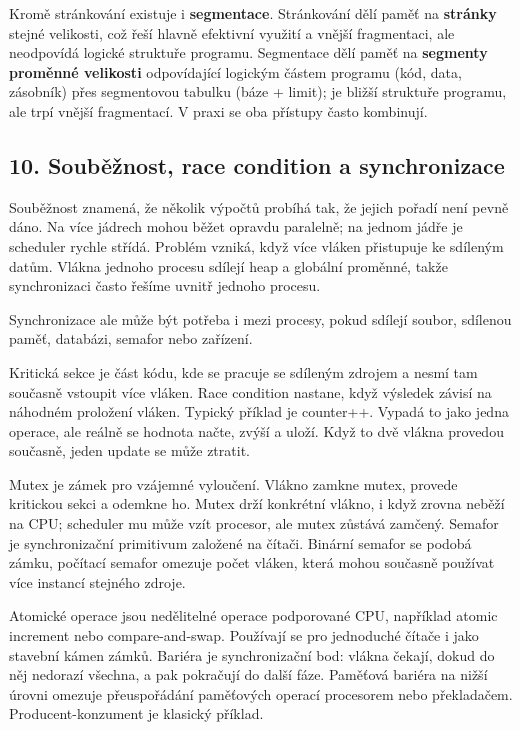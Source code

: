 \documentclass[11pt,a4paper]{article}
\begin{document}
Kromě stránkování existuje i \textbf{segmentace}. Stránkování dělí paměť na \textbf{stránky} stejné velikosti, což řeší hlavně efektivní využití a vnější fragmentaci, ale neodpovídá logické struktuře programu. Segmentace dělí paměť na \textbf{segmenty proměnné velikosti} odpovídající logickým částem programu (kód, data, zásobník) přes segmentovou tabulku (báze + limit); je bližší struktuře programu, ale trpí vnější fragmentací. V praxi se oba přístupy často kombinují.

\subsection*{10. Souběžnost, race condition a synchronizace}

Souběžnost znamená, že několik výpočtů probíhá tak, že jejich pořadí není pevně dáno. Na více jádrech mohou běžet opravdu paralelně; na jednom jádře je scheduler rychle střídá. Problém vzniká, když více vláken přistupuje ke sdíleným datům. Vlákna jednoho procesu sdílejí heap a globální proměnné, takže synchronizaci často řešíme uvnitř jednoho procesu.

Synchronizace ale může být potřeba i mezi procesy, pokud sdílejí soubor, sdílenou paměť, databázi, semafor nebo zařízení.

Kritická sekce je část kódu, kde se pracuje se sdíleným zdrojem a nesmí tam současně vstoupit více vláken. Race condition nastane, když výsledek závisí na náhodném proložení vláken. Typický příklad je counter++. Vypadá to jako jedna operace, ale reálně se hodnota načte, zvýší a uloží. Když to dvě vlákna provedou současně, jeden update se může ztratit.

Mutex je zámek pro vzájemné vyloučení. Vlákno zamkne mutex, provede kritickou sekci a odemkne ho. Mutex drží konkrétní vlákno, i když zrovna neběží na CPU; scheduler mu může vzít procesor, ale mutex zůstává zamčený. Semafor je synchronizační primitivum založené na čítači. Binární semafor se podobá zámku, počítací semafor omezuje počet vláken, která mohou současně používat více instancí stejného zdroje.

Atomické operace jsou nedělitelné operace podporované CPU, například atomic increment nebo compare-and-swap. Používají se pro jednoduché čítače i jako stavební kámen zámků. Bariéra je synchronizační bod: vlákna čekají, dokud do něj nedorazí všechna, a pak pokračují do další fáze. Paměťová bariéra na nižší úrovni omezuje přeuspořádání paměťových operací procesorem nebo překladačem. Producent-konzument je klasický příklad.
\end{document}
